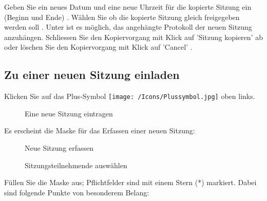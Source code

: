 Geben Sie ein neues Datum und eine neue Uhrzeit für die kopierte Sitzung ein (Beginn und Ende) . Wählen Sie ob die kopierte Sitzung gleich freigegeben werden soll . Unter  ist es möglich, das angehängte Protokoll der neuen Sitzung anzuhängen. Schliessen Sie den Kopiervorgang mit Klick auf 'Sitzung kopieren'  ab oder löschen  Sie den Kopiervorgang mit Klick auf 'Cancel' .

\vspace{\baselineskip}



\subsection{Zu einer neuen Sitzung einladen}
\label{bkm:Ref434828480}

Klicken Sie auf das Plus-Symbol \texttt{[image: /Icons/Plussymbol.jpg]}  oben links.

\vspace{\baselineskip}

\begin{figure}[H]
\caption{Eine neue Sitzung eintragen}
\end{figure}


Es erscheint die Maske für das Erfassen einer neuen Sitzung:

\begin{figure}[H]
\caption{Neue Sitzung erfassen}
\end{figure}

\begin{figure}[H]
\caption{Sitzungsteilnehmende auswählen}
\end{figure}

Füllen Sie die Maske aus; Pflichtfelder sind mit einem Stern (*) markiert. Dabei sind folgende Punkte von besonderem Belang:

